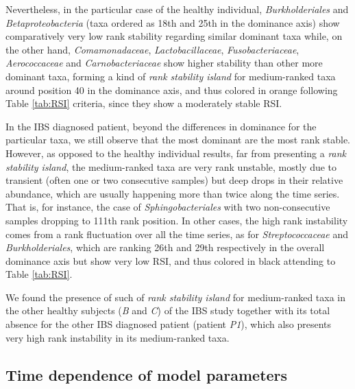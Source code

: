 Nevertheless, in the particular case of the healthy individual, \emph{Burkholderiales} and \emph{Betaproteobacteria} (taxa ordered as 18th and 25th in the dominance axis) show comparatively very low rank stability regarding similar dominant taxa while, on the other hand, \emph{Comamonadaceae}, \emph{Lactobacillaceae}, \emph{Fusobacteriaceae}, \emph{Aerococcaceae} and \emph{Carnobacteriaceae} show higher stability than other more dominant taxa, forming a kind of \emph{rank stability island} for medium-ranked taxa around position 40 in the dominance axis, and thus colored in orange following Table \ref{tab:RSI} criteria, since they show a moderately stable RSI.

In the IBS diagnosed patient, beyond the differences in dominance for the particular taxa, we still observe that the most dominant are the most rank stable. However, as opposed to the healthy individual results, far from presenting a \emph{rank stability island}, the medium-ranked taxa are very rank unstable, mostly due to transient (often one or two consecutive samples) but deep drops in their relative abundance, which are usually happening more than twice along the time series. That is, for instance, the case of \emph{Sphingobacteriales} with two non-consecutive samples dropping to 111th rank position. In other cases, the high rank instability comes from a rank fluctuation over all the time series, as for \emph{Streptococcaceae} and \emph{Burkholderiales}, which are ranking 26th and 29th respectively in the overall dominance axis but show very low RSI, and thus colored in black attending to Table \ref{tab:RSI}.

We found the presence of such of \emph{rank stability island} for medium-ranked taxa in the other healthy subjects (\emph{B} and \emph{C}) of the IBS study\cite{IBS} together with its total absence for the other IBS diagnosed patient (patient \emph{P1}), which also presents very high rank instability in its medium-ranked taxa.

\subsection*{Time dependence of model parameters}

